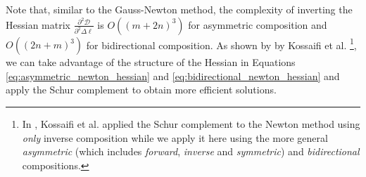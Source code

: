 Note that, similar to the Gauss-Newton method, the complexity of inverting the Hessian matrix $\frac{\partial^2 \mathcal{D}}{\partial^2 \Delta \boldsymbol{\ell}}$ is $O((m+2n)^3)$ for asymmetric composition and $O((2n + m)^3)$ for bidirectional composition. As shown by by Kossaifi et al. \cite{Kossaifi2014}\footnote{In \cite{Kossaifi2014}, Kossaifi et al. applied the Schur complement to the Newton method using \emph{only} inverse composition while we apply it here using the more general \emph{asymmetric} (which includes \emph{forward}, \emph{inverse} and \emph{symmetric}) and \emph{bidirectional} compositions.}, we can take advantage of the structure of the Hessian in Equations \ref{eq:asymmetric_newton_hessian} and \ref{eq:bidirectional_newton_hessian} and apply the Schur complement to obtain more efficient solutions.

